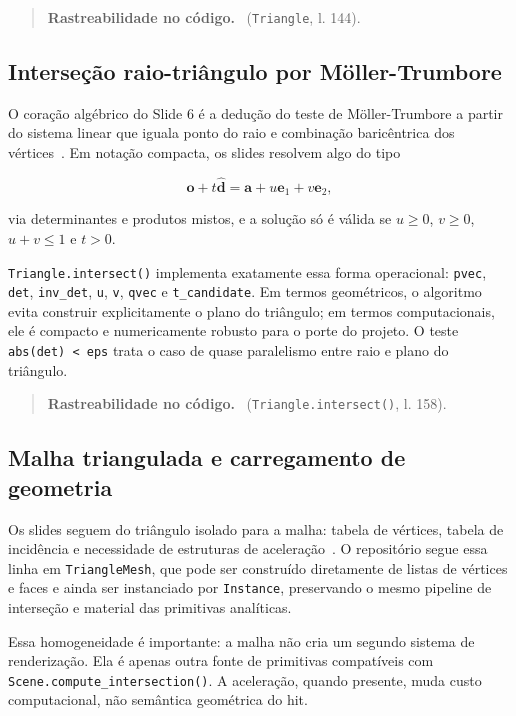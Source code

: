 \documentclass[portuguese]{sbcreviews-2025}%
\newcommand{\slidescite}[2]{\citep[pp.~#2]{#1}}
\newcommand{\traceability}[1]{%
    \begin{quote}
    \footnotesize\textbf{Rastreabilidade no c\'odigo.}~#1
    \end{quote}
}
\begin{document}
\traceability{ (\texttt{Triangle}, l. 144).}

\subsection{Interseção raio-triângulo por Möller-Trumbore}
\label{sec:slide6-moller}

O coração algébrico do Slide 6 é a dedução do teste de Möller-Trumbore a partir do sistema linear que iguala ponto do raio e combinação baricêntrica dos vértices~\slidescite{inf2608slides06}{5--12}. Em notação compacta, os slides resolvem algo do tipo

\[
\mathbf{o}+t\hat{\mathbf{d}} = \mathbf{a}+u\mathbf{e}_1+v\mathbf{e}_2,
\]

via determinantes e produtos mistos, e a solução só é válida se $u\ge 0$, $v\ge 0$, $u+v\le 1$ e $t>0$.

\texttt{Triangle.intersect()} implementa exatamente essa forma operacional: \texttt{pvec}, \texttt{det}, \texttt{inv\_det}, \texttt{u}, \texttt{v}, \texttt{qvec} e \texttt{t\_candidate}. Em termos geométricos, o algoritmo evita construir explicitamente o plano do triângulo; em termos computacionais, ele é compacto e numericamente robusto para o porte do projeto. O teste \texttt{abs(det) < eps} trata o caso de quase paralelismo entre raio e plano do triângulo.

\traceability{ (\texttt{Triangle.intersect()}, l. 158).}

\subsection{Malha triangulada e carregamento de geometria}
\label{sec:slide6-malha}

Os slides seguem do triângulo isolado para a malha: tabela de vértices, tabela de incidência e necessidade de estruturas de aceleração~\slidescite{inf2608slides06}{13--14}. O repositório segue essa linha em \texttt{TriangleMesh}, que pode ser construído diretamente de listas de vértices e faces e ainda ser instanciado por \texttt{Instance}, preservando o mesmo pipeline de interseção e material das primitivas analíticas.

Essa homogeneidade é importante: a malha não cria um segundo sistema de renderização. Ela é apenas outra fonte de primitivas compatíveis com \texttt{Scene.compute\_intersection()}. A aceleração, quando presente, muda custo computacional, não semântica geométrica do hit.
\end{document}
